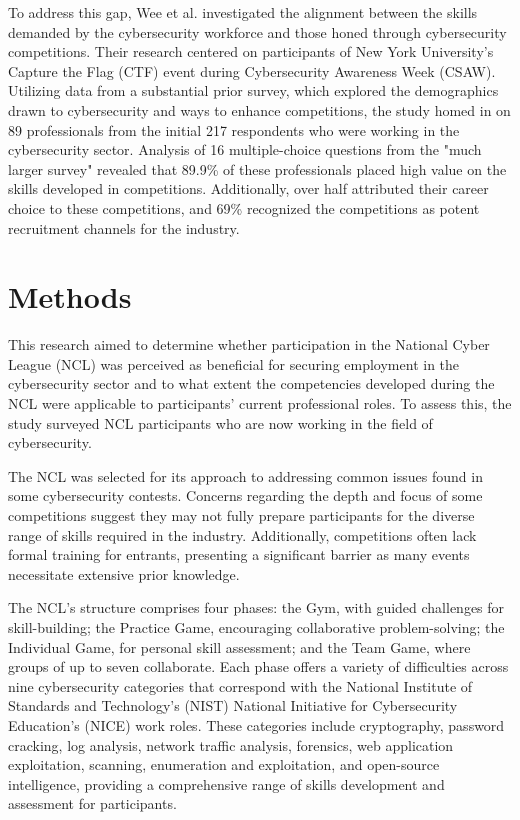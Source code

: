 \documentclass{article}
\begin{document}
To address this gap, Wee et al.\cite{soups16} investigated the alignment between the skills demanded by the cybersecurity workforce and those honed through cybersecurity competitions. Their research centered on participants of New York University's Capture the Flag (CTF) event during Cybersecurity Awareness Week (CSAW). Utilizing data from a substantial prior survey, which explored the demographics drawn to cybersecurity and ways to enhance competitions, the study homed in on 89 professionals from the initial 217 respondents who were working in the cybersecurity sector. Analysis of 16 multiple-choice questions from the "much larger survey" revealed that 89.9\% of these professionals placed high value on the skills developed in competitions. Additionally, over half attributed their career choice to these competitions, and 69\% recognized the competitions as potent recruitment channels for the industry\cite{soups16}.


\section{Methods}

This research aimed to determine whether participation in the National Cyber League (NCL) was perceived as beneficial for securing employment in the cybersecurity sector and to what extent the competencies developed during the NCL were applicable to participants' current professional roles. To assess this, the study surveyed NCL participants who are now working in the field of cybersecurity. 

The NCL was selected for its approach to addressing common issues found in some cybersecurity contests. Concerns regarding the depth and focus of some competitions suggest they may not fully prepare participants for the diverse range of skills required in the industry\cite{cheung2012effectiveness,katsantonis2017conceptual,mouheb2019cybersecurity}. Additionally, competitions often lack formal training for entrants\cite{mouheb2019cybersecurity}, presenting a significant barrier as many events necessitate extensive prior knowledge\cite{cheung2012effectiveness}.

The NCL's structure comprises four phases: the Gym, with guided challenges for skill-building; the Practice Game, encouraging collaborative problem-solving; the Individual Game, for personal skill assessment; and the Team Game, where groups of up to seven collaborate\cite{nclwebsite}. Each phase offers a variety of difficulties across nine cybersecurity categories that correspond with the National Institute of Standards and Technology’s (NIST) National Initiative for Cybersecurity Education’s (NICE) work roles. These categories include cryptography, password cracking, log analysis, network traffic analysis, forensics, web application exploitation, scanning, enumeration and exploitation, and open-source intelligence, providing a comprehensive range of skills development and assessment for participants.
\end{document}
